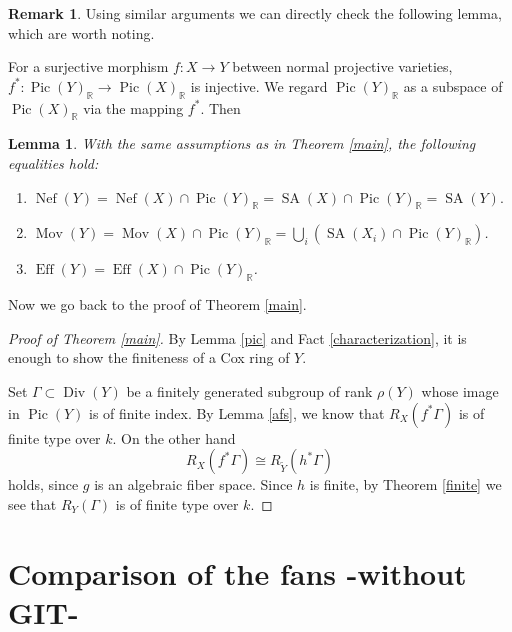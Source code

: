 \documentclass[12pt,twoside]{amsart}
\newtheorem{lem}[theo]{Lemma}
\theoremstyle{definition}
\newtheorem{rem}[theo]{Remark}
\newcommand\Nef{\mathop{\mathrm{Nef}}\nolimits}
\newcommand\SA{\mathop{\mathrm{SA}}\nolimits}
\newcommand\Pic{\mathop{\mathrm{Pic}}\nolimits}
\newcommand\Mov{\mathop{\mathrm{Mov}}\nolimits}
\newcommand\Eff{\mathop{\mathrm{Eff}}\nolimits}
\newcommand\Divi{\mathop{\mathrm{Div}}\nolimits}
\newcommand\br{\mathbb{R}}
\begin{document}
\begin{rem}
Using similar arguments we can directly check the following lemma, which are worth noting.

For a surjective morphism $f:X\to Y$ between normal projective varieties,
$f^{*}:\Pic{(Y)}_{\br}\to\Pic{(X)}_{\br}$ is injective. We regard $\Pic{(Y)}_{\br}$ as
a subspace of $\Pic{(X)}_{\br}$ via the mapping $f^{*}$. Then

\begin{lem}\label{direct}
With the same assumptions
as in Theorem \ref{main}, the following equalities hold:
\begin{enumerate}
\item
$\Nef{(Y)} = \Nef{(X)}\cap \Pic{(Y)}_{\br}=\SA{(X)}\cap\Pic{(Y)}_{\br}=\SA{(Y)}.$

\item
$\Mov{(Y)}=\Mov{(X)}\cap\Pic{(Y)}_{\br}
=\bigcup_{i}(\SA{(X_i)}\cap\Pic{(Y)}_{\br})$.

\item
$\Eff{(Y)}=\Eff{(X)}\cap\Pic{(Y)}_{\br}$.
\end{enumerate}
\end{lem}
\end{rem}


Now we go back to the proof of Theorem \ref{main}.
\begin{proof}[Proof of Theorem \ref{main}]
By Lemma \ref{pic} and Fact \ref{characterization},
it is enough to show the finiteness of a Cox ring of $Y$.

Set $\Gamma\subset\Divi{(Y)}$ be a finitely generated subgroup of rank $\rho{(Y)}$
whose image in $\Pic{(Y)}$ is of finite index.
By Lemma \ref{afs}, we know that $R_X(f^{*}\Gamma)$
is of finite type over $k$. On the other hand
\begin{equation*}
R_X(f^{*}\Gamma)\cong R_{\tilde{Y}}(h^{*}\Gamma)
\end{equation*}
holds, since $g$ is an algebraic fiber space.
Since $h$ is finite, by Theorem \ref{finite} we see that $R_Y(\Gamma)$ is of finite type over $k$.
\end{proof}



\section{Comparison of the fans -without GIT-}\label{Comparison of the fans -without GIT-}
\end{document}
